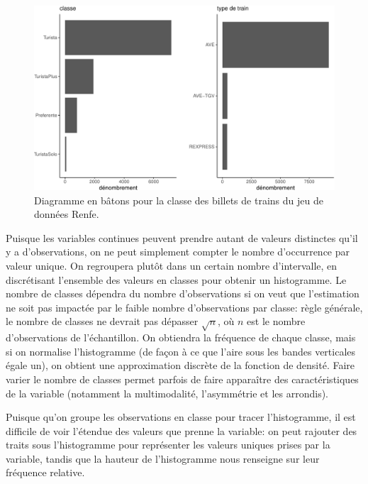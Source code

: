 \documentclass[
  11pt,
  letterpaper,
]{book}
\theoremstyle{definition}
\theoremstyle{remark}
\begin{document}
\begin{figure}[ht!]

{\centering \includegraphics[width=1\textwidth,height=\textheight]{./01-analyseexploratoire_files/figure-pdf/fig-barplotrenfe-1.pdf}

}

\caption{\label{fig-barplotrenfe}Diagramme en bâtons pour la classe des
billets de trains du jeu de données Renfe.}

\end{figure}

Puisque les variables continues peuvent prendre autant de valeurs
distinctes qu'il y a d'observations, on ne peut simplement compter le
nombre d'occurrence par valeur unique. On regroupera plutôt dans un
certain nombre d'intervalle, en discrétisant l'ensemble des valeurs en
classes pour obtenir un histogramme. Le nombre de classes dépendra du
nombre d'observations si on veut que l'estimation ne soit pas impactée
par le faible nombre d'observations par classe: règle générale, le
nombre de classes ne devrait pas dépasser \(\sqrt{n}\), où \(n\) est le
nombre d'observations de l'échantillon. On obtiendra la fréquence de
chaque classe, mais si on normalise l'histogramme (de façon à ce que
l'aire sous les bandes verticales égale un), on obtient une
approximation discrète de la fonction de densité. Faire varier le nombre
de classes permet parfois de faire apparaître des caractéristiques de la
variable (notamment la multimodalité, l'asymmétrie et les arrondis).

Puisque qu'on groupe les observations en classe pour tracer
l'histogramme, il est difficile de voir l'étendue des valeurs que prenne
la variable: on peut rajouter des traits sous l'histogramme pour
représenter les valeurs uniques prises par la variable, tandis que la
hauteur de l'histogramme nous renseigne sur leur fréquence relative.
\end{document}
